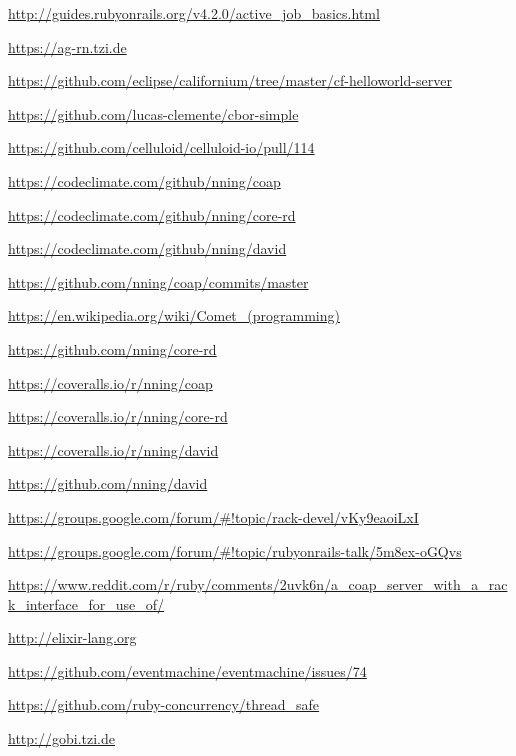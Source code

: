 \urldef{\urlActiveJob}
	\url{http://guides.rubyonrails.org/v4.2.0/active_job_basics.html}

\urldef{\urlAgrn}
	\url{https://ag-rn.tzi.de}

\urldef{\urlCaliforniumHelloWorld}
	\url{https://github.com/eclipse/californium/tree/master/cf-helloworld-server}

\urldef{\urlCborSimple}
	\url{https://github.com/lucas-clemente/cbor-simple}

\urldef{\urlCelluloidIoPr}
	\url{https://github.com/celluloid/celluloid-io/pull/114}

\urldef{\urlClimateCoap}
	\url{https://codeclimate.com/github/nning/coap}

\urldef{\urlClimateCoreRd}
	\url{https://codeclimate.com/github/nning/core-rd}

\urldef{\urlClimateDavid}
	\url{https://codeclimate.com/github/nning/david}

\urldef{\urlCoapChanges}
	\url{https://github.com/nning/coap/commits/master}

\urldef{\urlComet}
	\url{https://en.wikipedia.org/wiki/Comet_(programming)}

\urldef{\urlCoreRd}
	\url{https://github.com/nning/core-rd}

\urldef{\urlCoverageCoap}
	\url{https://coveralls.io/r/nning/coap}

\urldef{\urlCoverageCoreRd}
	\url{https://coveralls.io/r/nning/core-rd}

\urldef{\urlCoverageDavid}
	\url{https://coveralls.io/r/nning/david}

\urldef{\urlDavid}
	\url{https://github.com/nning/david}

\urldef{\urlDavidMlRack}
	\url{https://groups.google.com/forum/#!topic/rack-devel/vKy9eaoiLxI}

\urldef{\urlDavidMlRails}
	\url{https://groups.google.com/forum/#!topic/rubyonrails-talk/5m8ex-oGQvs}

\urldef{\urlDavidReddit}
	\url{https://www.reddit.com/r/ruby/comments/2uvk6n/a_coap_server_with_a_rack_interface_for_use_of/}

\urldef{\urlElixir}
	\url{http://elixir-lang.org}

\urldef{\urlEMSix}
	\url{https://github.com/eventmachine/eventmachine/issues/74}

\urldef{\urlGemThreadsafe}
	\url{https://github.com/ruby-concurrency/thread_safe}

\urldef{\urlGobi} %
	\url{http://gobi.tzi.de}

